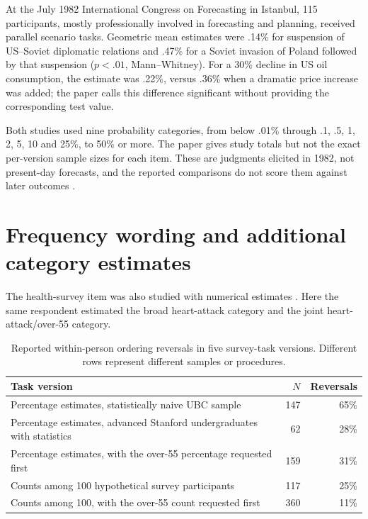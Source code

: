 At the July 1982 International Congress on Forecasting in Istanbul,
115 participants, mostly professionally involved in forecasting and
planning, received parallel scenario tasks. Geometric mean estimates
were .14\% for suspension of US--Soviet diplomatic relations and
.47\% for a Soviet invasion of Poland followed by that suspension
(\(p<.01\), Mann--Whitney). For a 30\% decline in US oil consumption,
the estimate was .22\%, versus .36\% when a dramatic price increase
was added; the paper calls this difference significant without
providing the corresponding test value.

Both studies used nine probability categories, from below .01\%
through .1, .5, 1, 2, 5, 10 and 25\%, to 50\% or more.
The paper gives study totals but not the exact per-version sample
sizes for each item. These are judgments elicited in 1982,
not present-day forecasts, and the reported comparisons do not
score them against later outcomes
\cite[pp.~307--308]{TverskyKahneman1983Conjunction}.

\section{Frequency wording and additional category estimates}
\label{sec:p19-conjunction-frequencies}

The health-survey item was also studied with numerical estimates
\cite[pp.~308--309]{TverskyKahneman1983Conjunction}.
Here the same respondent estimated the broad heart-attack category
and the joint heart-attack/over-55 category.

\begin{table}[htbp]
\centering\small
\begin{tabular}{p{.65\linewidth}rr}
\hline
Task version & \(N\) & Reversals\\ \hline
Percentage estimates, statistically naive UBC sample &147&65\%\\
Percentage estimates, advanced Stanford undergraduates with statistics &62&28\%\\
Percentage estimates, with the over-55 percentage requested first &159&31\%\\
Counts among 100 hypothetical survey participants &117&25\%\\
Counts among 100, with the over-55 count requested first &360&11\%\\ \hline
\end{tabular}
\caption{Reported within-person ordering reversals in five survey-task versions.
Different rows represent different samples or procedures.}
\label{tab:p19-conjunction-frequency}
\end{table}

